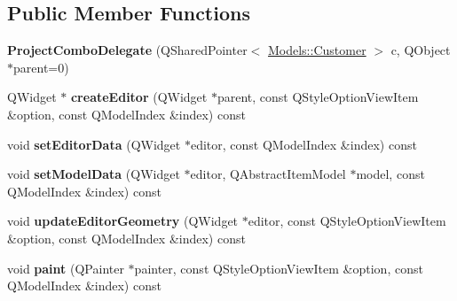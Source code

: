 \subsection*{Public Member Functions}
\begin{DoxyCompactItemize}
\item 
\hypertarget{classGui_1_1Widgets_1_1Delegates_1_1ProjectComboDelegate_a5fda87c3db87a0928717810a0ac2812f}{{\bfseries Project\-Combo\-Delegate} (Q\-Shared\-Pointer$<$ \hyperlink{classModels_1_1Customer}{Models\-::\-Customer} $>$ c, Q\-Object $\ast$parent=0)}\label{classGui_1_1Widgets_1_1Delegates_1_1ProjectComboDelegate_a5fda87c3db87a0928717810a0ac2812f}

\item 
\hypertarget{classGui_1_1Widgets_1_1Delegates_1_1ProjectComboDelegate_adbfc28a3e6de34dc63d7290ae5b5c053}{Q\-Widget $\ast$ {\bfseries create\-Editor} (Q\-Widget $\ast$parent, const Q\-Style\-Option\-View\-Item \&option, const Q\-Model\-Index \&index) const }\label{classGui_1_1Widgets_1_1Delegates_1_1ProjectComboDelegate_adbfc28a3e6de34dc63d7290ae5b5c053}

\item 
\hypertarget{classGui_1_1Widgets_1_1Delegates_1_1ProjectComboDelegate_a154846518810338a4ddaaa96ad29f7fe}{void {\bfseries set\-Editor\-Data} (Q\-Widget $\ast$editor, const Q\-Model\-Index \&index) const }\label{classGui_1_1Widgets_1_1Delegates_1_1ProjectComboDelegate_a154846518810338a4ddaaa96ad29f7fe}

\item 
\hypertarget{classGui_1_1Widgets_1_1Delegates_1_1ProjectComboDelegate_a7281f5f400d7f3a6e150cd17a3e95beb}{void {\bfseries set\-Model\-Data} (Q\-Widget $\ast$editor, Q\-Abstract\-Item\-Model $\ast$model, const Q\-Model\-Index \&index) const }\label{classGui_1_1Widgets_1_1Delegates_1_1ProjectComboDelegate_a7281f5f400d7f3a6e150cd17a3e95beb}

\item 
\hypertarget{classGui_1_1Widgets_1_1Delegates_1_1ProjectComboDelegate_a3ea80843021afbcb24012d505b61c2b6}{void {\bfseries update\-Editor\-Geometry} (Q\-Widget $\ast$editor, const Q\-Style\-Option\-View\-Item \&option, const Q\-Model\-Index \&index) const }\label{classGui_1_1Widgets_1_1Delegates_1_1ProjectComboDelegate_a3ea80843021afbcb24012d505b61c2b6}

\item 
\hypertarget{classGui_1_1Widgets_1_1Delegates_1_1ProjectComboDelegate_a20cbc84d26b83083fdf7efecae3407cf}{void {\bfseries paint} (Q\-Painter $\ast$painter, const Q\-Style\-Option\-View\-Item \&option, const Q\-Model\-Index \&index) const }\label{classGui_1_1Widgets_1_1Delegates_1_1ProjectComboDelegate_a20cbc84d26b83083fdf7efecae3407cf}

\end{DoxyCompactItemize}


